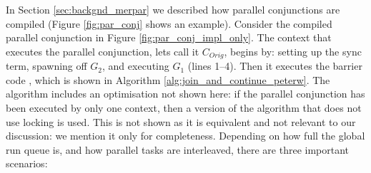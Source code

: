 In Section \ref{sec:backgnd_merpar} we described how parallel
conjunctions are compiled
(Figure \ref{fig:par_conj} shows an example).
Consider the compiled parallel conjunction in Figure
\ref{fig:par_conj_impl_only}.
The context that executes the parallel conjunction,
lets call it $C_{Orig}$,
begins by:
setting up the sync term,
spawning off $G_2$,
and executing $G_1$ (lines 1--4).
Then it executes the barrier code
\joinandcontinue, which is shown in 
Algorithm \ref{alg:join_and_continue_peterw}.
The algorithm includes an optimisation not shown here:
if the parallel conjunction has been executed by only one context,
then a version of the algorithm that does not use locking is used.
This is not shown as it is equivalent and not relevant to
our discussion:
we mention it only for completeness.
Depending on how full the global run queue is,
and how parallel tasks are interleaved,
there are three important scenarios:

